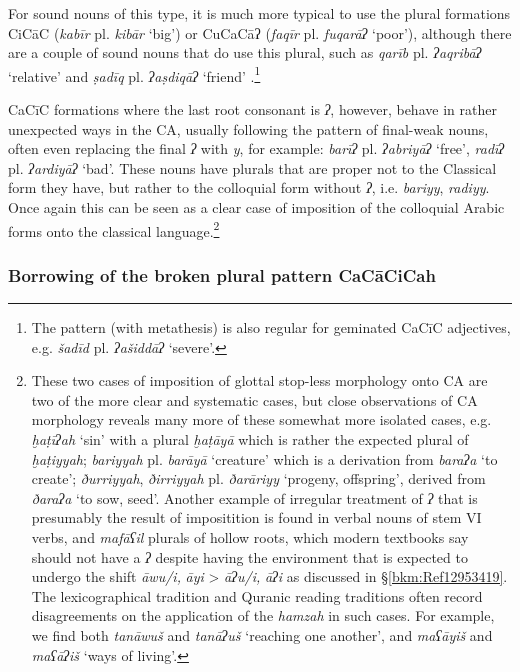 \documentclass[output=paper]{langsci/langscibook}
\begin{document}
For sound nouns of this type, it is much more typical to use the plural formations CiCāC (\textit{kabīr} pl. \textit{kibār} ‘big’) or CuCaCāʔ (\textit{faqīr} pl. \textit{fuqarāʔ} ‘poor’), although there are a couple of sound nouns that do use this plural, such as \textit{qarīb} pl. \textit{ʔaqribāʔ} ‘relative’ and \textit{ṣadīq} pl. \textit{ʔaṣdiqāʔ} ‘friend’ \citep[106--107]{Ratcliffe1998}.\footnote{The pattern (with metathesis) is also regular for geminated CaCīC adjectives, e.g. \textit{šadīd}  pl. \textit{ʔašiddāʔ} ‘severe’.}

CaCīC formations where the last root consonant is \textit{ʔ}, however, behave in rather unexpected ways in the CA, usually following the pattern of final-weak nouns, often even replacing the final \textit{ʔ} with \textit{y}, for example: \textit{barīʔ} pl. \textit{ʔabriyāʔ} ‘free’, \textit{radīʔ} pl. \textit{ʔardiyāʔ} ‘bad’. These nouns have plurals that are proper not to the Classical form they have, but rather to the colloquial form without \textit{ʔ}, i.e. \textit{bariyy}, \textit{radiyy}. Once again this can be seen as a clear case of imposition of the colloquial Arabic forms onto the classical language.\footnote{These two cases of imposition of glottal stop-less morphology onto CA are two of the more clear and systematic cases, but close observations of CA morphology reveals many more of these somewhat more isolated cases, e.g. \textit{ḫaṭīʔah} ‘sin’ with a plural \textit{ḫaṭāyā} which is rather the expected plural of \textit{ḫaṭiyyah}; \textit{bariyyah} pl. \textit{barāyā} ‘creature’ which is a derivation from \textit{baraʔa} ‘to create’; \textit{ðurriyyah}, \textit{ðirriyyah} pl. \textit{ðarāriyy} ‘progeny, offspring’, derived from \textit{ðaraʔa} ‘to sow, seed’. Another example of irregular treatment of \textit{ʔ} that is presumably the result of impositition is found in verbal nouns of stem VI verbs, and \textit{mafāʕil} plurals of hollow roots, which modern textbooks say should not have a \textit{ʔ} despite having the environment that is expected to undergo the shift \textit{āwu/i,} \textit{āyi} > \textit{āʔu/i,} \textit{āʔi} as discussed in §\ref{bkm:Ref12953419}. The lexicographical tradition and Quranic reading traditions often record disagreements on the application of the \textit{hamzah} in such cases. For example, we find both \textit{tanāwuš} and \textit{tanāʔuš} ‘reaching one another’, and \textit{maʕāyiš} and \textit{maʕāʔiš} ‘ways of living’.}

\subsubsection{\label{bkm:Ref13224664}Borrowing of the broken plural pattern CaCāCiCah}
\end{document}
